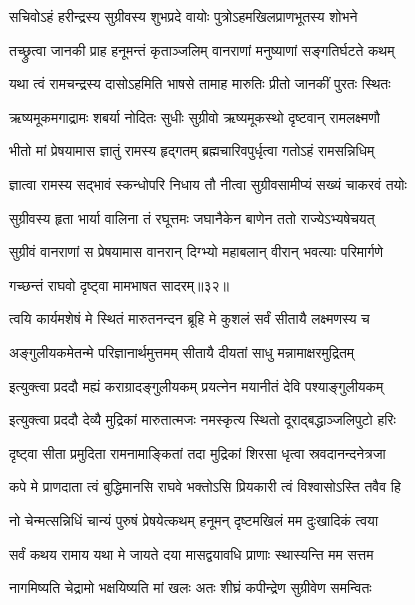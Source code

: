 \twolineshloka
{सचिवोऽहं हरीन्द्रस्य सुग्रीवस्य शुभप्रदे}
{वायोः पुत्रोऽहमखिलप्राणभूतस्य शोभने} %

\twolineshloka
{तच्छ्रुत्वा जानकी प्राह हनूमन्तं कृताञ्जलिम्}
{वानराणां मनुष्याणां सङ्गतिर्घटते कथम्} %

\twolineshloka
{यथा त्वं रामचन्द्रस्य दासोऽहमिति भाषसे}
{तामाह मारुतिः प्रीतो जानकीं पुरतः स्थितः} %

\twolineshloka
{ऋष्यमूकमगाद्रामः शबर्या नोदितः सुधीः}
{सुग्रीवो ऋष्यमूकस्थो दृष्टवान् रामलक्ष्मणौ} %

\twolineshloka
{भीतो मां प्रेषयामास ज्ञातुं रामस्य हृद्गतम्}
{ब्रह्मचारिवपुर्धृत्वा गतोऽहं रामसन्निधिम्} %

\twolineshloka
{ज्ञात्वा रामस्य सद्भावं स्कन्धोपरि निधाय तौ}
{नीत्वा सुग्रीवसामीप्यं सख्यं चाकरवं तयोः} %

\twolineshloka
{सुग्रीवस्य हृता भार्या वालिना तं रघूत्तमः}
{जघानैकेन बाणेन ततो राज्येऽभ्यषेचयत्} %

\twolineshloka
{सुग्रीवं वानराणां स प्रेषयामास वानरान्}
{दिग्भ्यो महाबलान् वीरान् भवत्याः परिमार्गणे} %

{गच्छन्तं राघवो दृष्ट्वा मामभाषत सादरम्॥३२॥} %


\twolineshloka
{त्वयि कार्यमशेषं मे स्थितं मारुतनन्दन}
{ब्रूहि मे कुशलं सर्वं सीतायै लक्ष्मणस्य च} %

\twolineshloka
{अङ्गुलीयकमेतन्मे परिज्ञानार्थमुत्तमम्}
{सीतायै दीयतां साधु मन्नामाक्षरमुद्रितम्} %

\twolineshloka
{इत्युक्त्वा प्रददौ मह्यं कराग्रादङ्गुलीयकम्}
{प्रयत्नेन मयानीतं देवि पश्याङ्गुलीयकम्} %

\twolineshloka
{इत्युक्त्वा प्रददौ देव्यै मुद्रिकां मारुतात्मजः}
{नमस्कृत्य स्थितो दूराद्बद्धाञ्जलिपुटो हरिः} %

\twolineshloka
{दृष्ट्वा सीता प्रमुदिता रामनामाङ्कितां तदा}
{मुद्रिकां शिरसा धृत्वा स्रवदानन्दनेत्रजा} %

\twolineshloka
{कपे मे प्राणदाता त्वं बुद्धिमानसि राघवे}
{भक्तोऽसि प्रियकारी त्वं विश्वासोऽस्ति तवैव हि} %

\twolineshloka
{नो चेन्मत्सन्निधिं चान्यं पुरुषं प्रेषयेत्कथम्}
{हनूमन् दृष्टमखिलं मम दुःखादिकं त्वया} %

\twolineshloka
{सर्वं कथय रामाय यथा मे जायते दया}
{मासद्वयावधि प्राणाः स्थास्यन्ति मम सत्तम} %

\twolineshloka
{नागमिष्यति चेद्रामो भक्षयिष्यति मां खलः}
{अतः शीघ्रं कपीन्द्रेण सुग्रीवेण समन्वितः} %


